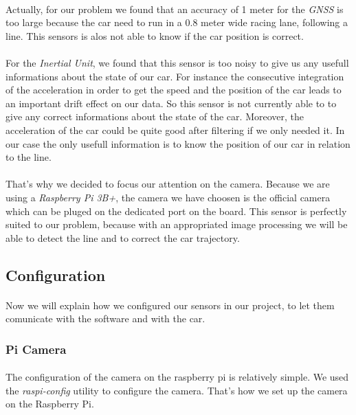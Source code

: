 \paragraph{}
Actually, for our problem we found that an accuracy of 1 meter
for the \textit{GNSS} is too large because the car need to run in a 0.8 meter
wide racing lane, following a line. This sensors is alos not able to know if
the car position is correct.

\paragraph{}
For the \textit{Inertial Unit}, we found that this sensor is too noisy to
give us any usefull informations about the state of our car. For instance the
consecutive integration of the acceleration in order to get the speed and the
position of the car leads to an important drift effect on our data. So this
sensor is not currently able to to give any correct informations about the state
of the car. Moreover, the acceleration of the car could be quite good after filtering
if we only needed it. In our case the only usefull information is to know the
position of our car in relation to the line.

\paragraph{}
That's why we decided to focus our attention on the camera. Because
we are using a \textit{Raspberry Pi 3B+}, the camera we have choosen is the official 
camera which can be pluged on the dedicated port on the board. This sensor is
perfectly suited to our problem, because with an appropriated image processing
we will be able to detect the line and to correct the car trajectory.

\subsection{Configuration}
\paragraph{}
Now we will explain how we configured our sensors in our project, to
let them comunicate with the software and with the car.

\subsubsection{Pi Camera}
\paragraph{}
The configuration of the camera on the raspberry pi is relatively simple. We
used the \textit{raspi-config} utility to configure the camera. That's how we set up
the camera on the Raspberry Pi.

